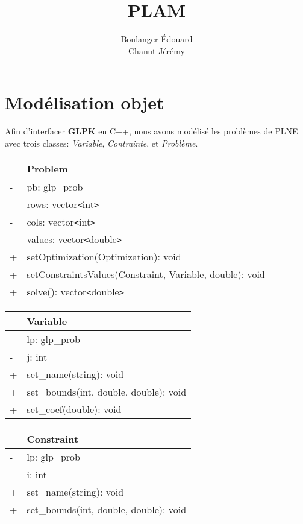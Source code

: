 \documentclass[11pt]{article}
\title{\textbf{PLAM}}
\author{Boulanger \'Edouard\\
		Chanut J\'er\'emy}
\date{}
\begin{document}
\maketitle

\section{Mod\'elisation objet}
Afin d'interfacer \textbf{GLPK} en C++, nous avons mod\'elis\'e les probl\`emes de PLNE avec trois classes: \emph{Variable}, \emph{Contrainte}, et \emph{Probl\`eme}.

\begin{table}[h]
\begin{center}
\begin{tabular}{|ll|}
\hline
 & \textbf{Problem} \\
\hline
- & pb: glp\_prob \\
- & rows: vector\verb|<|int\verb|>| \\
- & cols: vector\verb|<|int\verb|>| \\
- & values: vector\verb|<|double\verb|>| \\
\hline
+ & setOptimization(Optimization): void \\
+ & setConstraintsValues(Constraint, Variable, double): void \\
+ & solve(): vector\verb|<|double\verb|>| \\
\hline
\end{tabular}
\end{center}
\end{table}

\begin{table}[h]
\begin{center}
\begin{tabular}{|ll|}
\hline
 & \textbf{Variable} \\
\hline
- & lp: glp\_prob \\
- & j: int \\
\hline
+ & set\_name(string): void \\
+ & set\_bounds(int, double, double): void \\
+ & set\_coef(double): void \\
\hline
\end{tabular}
\end{center}
\end{table}

\begin{table}[h]
\begin{center}
\begin{tabular}{|ll|}
\hline
 & \textbf{Constraint} \\
\hline
- & lp: glp\_prob \\
- & i: int \\
\hline
+ & set\_name(string): void \\
+ & set\_bounds(int, double, double): void \\
\hline
\end{tabular}
\end{center}
\end{table}
\end{document}
